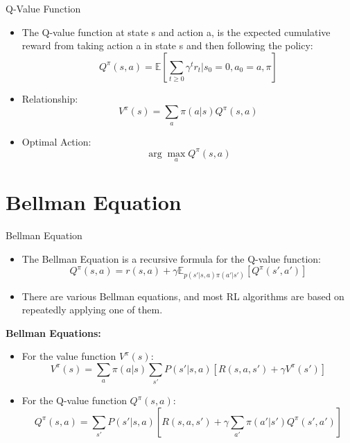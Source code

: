 \begin{frame}{Q-Value Function}
\begin{itemize}
    \item The Q-value function at state s and action a, is the expected cumulative reward from taking action a in state s and then following the policy:
    $$Q^{\pi}(s,a) = \mathbb{E} \left [ \sum_{t \geq 0} \gamma^t r_t | s_0=0, a_0=a, \pi \right ]$$
    \item Relationship: $$V^{\pi}(s) = \sum_a \pi(a|s) Q^{\pi}(s,a)$$
    \item Optimal Action: $$\arg \max_a Q^{\pi}(s,a)$$
\end{itemize}
    
\end{frame}

\section{Bellman Equation}
\begin{frame}{Bellman Equation}
\begin{itemize}
    \item The Bellman Equation is a recursive formula for the Q-value function:
$$Q^{\pi}(s,a) =  r(s,a) + \gamma \mathbb{E}_{p(s'|s, a)\pi(a'|s')}\left [ Q^{\pi}(s',a') \right ]$$
    \item There are various Bellman equations, and most RL algorithms are
based on repeatedly applying one of them.
    
\end{itemize}

\item \textbf{Bellman Equations:}
\begin{itemize}
    \item For the value function $V^{\pi}(s)$:
    $$
    V^{\pi}(s) = \sum_{a} \pi(a|s) \sum_{s'} P(s'|s,a) \left[ R(s,a,s') + \gamma V^{\pi}(s') \right]
    $$
    \item For the Q-value function $Q^{\pi}(s,a)$:
    $$
    Q^{\pi}(s,a) = \sum_{s'} P(s'|s,a) \left[ R(s,a,s') + \gamma \sum_{a'} \pi(a'|s') Q^{\pi}(s',a') \right]
    $$
\end{itemize}
    
\end{frame}

